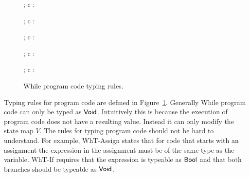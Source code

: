 \begin{figure}[h]

  \RuleSpace

  {\Gamma \vdash {}; c : \WhVoid}

  \RuleSpace 

  {\Gamma \vdash {}; c : \WhVoid}

  \RuleSpace

  {\Gamma \vdash \WhSkip; c : \WhVoid}

  \RuleSpace

  {\Gamma \vdash {}; c : \WhVoid}

  \RuleSpace

  {\Gamma \vdash {}; c : \WhVoid}

  \caption{While program code typing rules.}
  \label{fig:while_code_tpe}
\end{figure}

Typing rules for program code are defined in Figure~\ref{fig:while_code_tpe}.
Generally While program code can only be typed as $\mbox{$\mathsf{Void}$}$. Intuitively this is
because the execution of program code does not have a resulting value. Instead
it can only modify the state map $V$. The rules for typing program code should
not be hard to understand. For example, {\sc WhT-Assign} states that for code that
starts with an assignment the expression in the assignment must be of the same
type as the variable. {\sc WhT-If} requires that the expression is typeable as
$\mbox{$\mathsf{Bool}$}$ and that both branches should be typeable as $\mbox{$\mathsf{Void}$}$.

